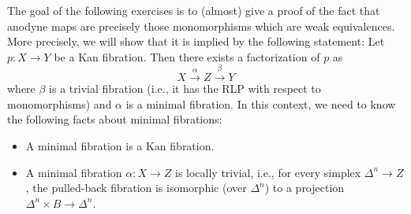 The goal of the following exercises is to (almost) give a proof of the fact that
anodyne maps are precisely those monomorphisms which are weak equivalences.
More precisely, we will show that it is implied by the following statement: Let
$p\colon X\to Y$ be a Kan fibration. Then there exists a factorization of $p$ as
\[
 X\xrightarrow{\alpha}Z\xrightarrow{\beta}Y
\]
where $\beta$ is a trivial fibration (i.e., it has the RLP with respect to monomorphisms)
and $\alpha$ is a minimal fibration. In this context, we need to know the following facts
about minimal fibrations:
\begin{itemize}
 \item A minimal fibration is a Kan fibration.
 \item A minimal fibration $\alpha\colon X\to Z$ is locally trivial, i.e., for every simplex
       $\Delta^n\to Z$, the pulled-back fibration is isomorphic (over $\Delta^n$) to a
       projection $\Delta^n\times B\to\Delta^n$.
\end{itemize}

